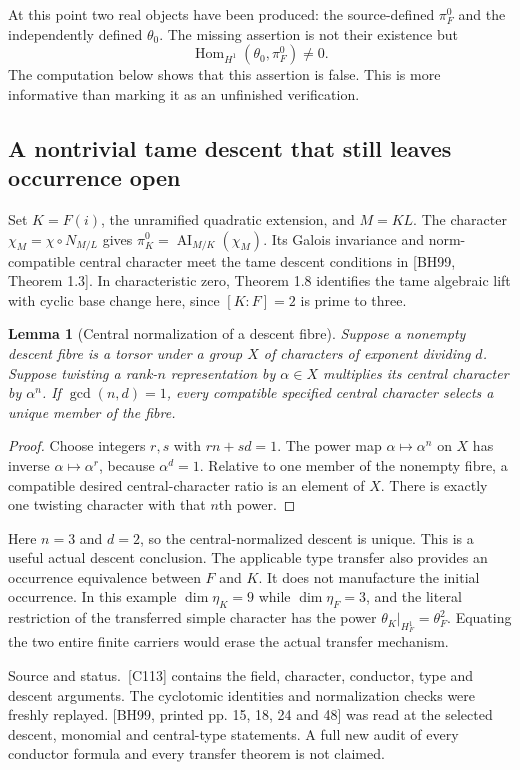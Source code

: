 \documentclass[11pt]{article}
\newtheorem{lemma}[proposition]{Lemma}
\theoremstyle{definition}\newtheorem{definition}[proposition]{Definition}
\newcommand{\Hom}{\operatorname{Hom}}
\newcommand{\AI}{\operatorname{AI}}
\newcommand{\source}[1]{\par{\small\textsf{Source and status.}\ #1}\par}
\begin{document}
At this point two real objects have been produced: the source-defined $\pi_F^0$ and the independently defined $\theta_0$. The missing assertion is not their existence but
\[
 \Hom_{H^1}(\theta_0,\pi_F^0)\neq0.
 \tag{17.6}\label{eq:occurrence-original}
\]
The computation below shows that this assertion is false. This is more informative than marking it as an unfinished verification.

\subsection{A nontrivial tame descent that still leaves occurrence open}
Set $K=F(i)$, the unramified quadratic extension, and $M=KL$. The character $\chi_M=\chi\circ N_{M/L}$ gives $\pi_K^0=\AI_{M/K}(\chi_M)$. Its Galois invariance and norm-compatible central character meet the tame descent conditions in [BH99, Theorem 1.3]. In characteristic zero, Theorem 1.8 identifies the tame algebraic lift with cyclic base change here, since $[K:F]=2$ is prime to three.

\begin{lemma}[Central normalization of a descent fibre]\label{lem:central}
Suppose a nonempty descent fibre is a torsor under a group $X$ of characters of exponent dividing $d$. Suppose twisting a rank-$n$ representation by $\alpha\in X$ multiplies its central character by $\alpha^n$. If $\gcd(n,d)=1$, every compatible specified central character selects a unique member of the fibre.
\end{lemma}
\begin{proof}
Choose integers $r,s$ with $rn+sd=1$. The power map $\alpha\mapsto\alpha^n$ on $X$ has inverse $\alpha\mapsto\alpha^r$, because $\alpha^d=1$. Relative to one member of the nonempty fibre, a compatible desired central-character ratio is an element of $X$. There is exactly one twisting character with that $n$th power.
\end{proof}

Here $n=3$ and $d=2$, so the central-normalized descent is unique. This is a useful actual descent conclusion. The applicable type transfer also provides an occurrence equivalence between $F$ and $K$. It does not manufacture the initial occurrence. In this example $\dim\eta_K=9$ while $\dim\eta_F=3$, and the literal restriction of the transferred simple character has the power $\theta_K|_{H_F^1}=\theta_F^2$. Equating the two entire finite carriers would erase the actual transfer mechanism.

\source{[C113] contains the field, character, conductor, type and descent arguments. The cyclotomic identities and normalization checks were freshly replayed. [BH99, printed pp. 15, 18, 24 and 48] was read at the selected descent, monomial and central-type statements. A full new audit of every conductor formula and every transfer theorem is not claimed.}
\end{document}
